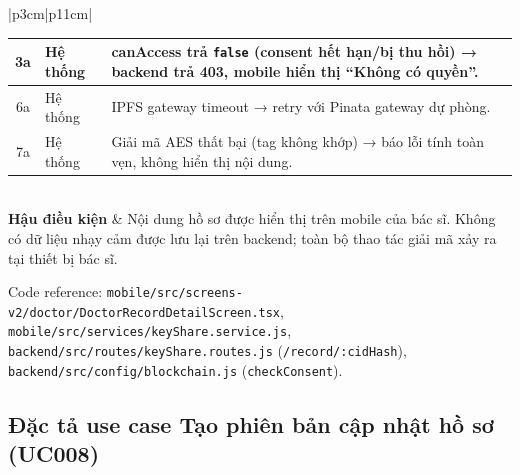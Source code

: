 \documentclass[../DoAn]{subfiles}
\begin{document}
\begin{table}[H]
\begin{tabular}{|p{3cm}|p{11cm}|}
\begin{tabular}{|c|p{2.3cm}|p{6cm}|}
3a & Hệ thống & canAccess trả \texttt{false} (consent hết hạn/bị thu hồi) → backend trả 403, mobile hiển thị ``Không có quyền''. \\ \hline
6a & Hệ thống & IPFS gateway timeout → retry với Pinata gateway dự phòng. \\ \hline
7a & Hệ thống & Giải mã AES thất bại (tag không khớp) → báo lỗi tính toàn vẹn, không hiển thị nội dung. \\ \hline
\end{tabular} \\ \hline
\textbf{Hậu điều kiện} & Nội dung hồ sơ được hiển thị trên mobile của bác sĩ. Không có dữ liệu nhạy cảm được lưu lại trên backend; toàn bộ thao tác giải mã xảy ra tại thiết bị bác sĩ. \\ \hline
\end{tabular}
\end{table}

Code reference: \texttt{mobile/src/screens-v2/doctor/DoctorRecordDetailScreen.tsx}, \texttt{mobile/src/services/keyShare.service.js}, \texttt{backend/src/routes/keyShare.routes.js} (\texttt{/record/:cidHash}), \texttt{backend/src/config/blockchain.js} (\texttt{checkConsent}).

\subsection{Đặc tả use case Tạo phiên bản cập nhật hồ sơ (UC008)}
\end{document}
